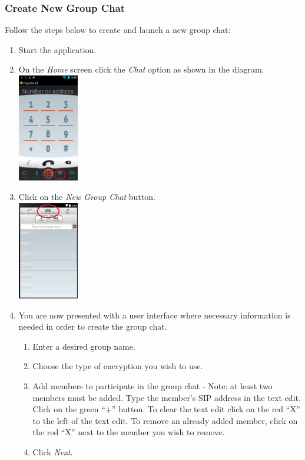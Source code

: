 \documentclass[11pt]{article}
\begin{document}
\subsubsection{Create New Group Chat} \label{create}
Follow the steps below to create and launch a new group chat:
\begin{enumerate}
\item Start the application.
\item On the \textit{Home} screen click the \textit{Chat} option as shown in the diagram.\\
\includegraphics[width=100px]{images/mainScreen.png}
\item Click on the \textit{New Group Chat} button.\\
\includegraphics[width=100px]{images/ChatlistCG.png}
\item You are now presented with a user interface where necessary information is needed in order to create the group chat.
\begin{enumerate}
\item Enter a desired group name.
\item Choose the type of encryption you wish to use.
\item Add members to participate in the group chat - Note: at least two members must be added.
\subitem Type the member's SIP address in the text edit.
\subitem Click on the green \enquote{+} button.
\subitem To clear the text edit click on the red \enquote{X} to the left of the text edit.
\subitem To remove an already added member, click on the red \enquote{X} next to the member you wish to remove.
\item Click \textit{Next}.

\end{enumerate}
\end{enumerate}
\end{document}
